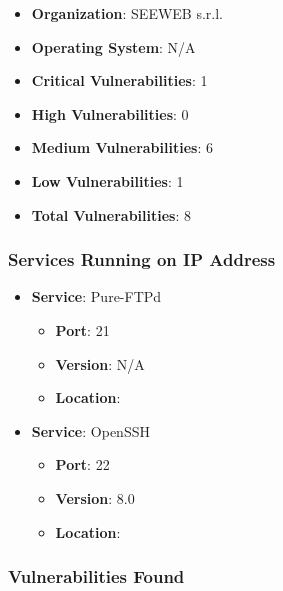 \documentclass{article}
\begin{document}
\begin{itemize}
    \item \textbf{Organization}: SEEWEB s.r.l.
    \item \textbf{Operating System}:  N/A 
    \item \textbf{Critical Vulnerabilities}: 1
    \item \textbf{High Vulnerabilities}: 0
    \item \textbf{Medium Vulnerabilities}: 6
    \item \textbf{Low Vulnerabilities}: 1
    \item \textbf{Total Vulnerabilities}: 8
\end{itemize}

\subsubsection*{Services Running on IP Address}

\begin{itemize}
    
        \item \textbf{Service}: Pure-FTPd
        \begin{itemize}
            \item \textbf{Port}: 21
            \item \textbf{Version}:  N/A 
            \item \textbf{Location}: \href{  }{  }
        \end{itemize}
    
        \item \textbf{Service}: OpenSSH
        \begin{itemize}
            \item \textbf{Port}: 22
            \item \textbf{Version}:  8.0 
            \item \textbf{Location}: \href{  }{  }
        \end{itemize}
    
\end{itemize}


\subsubsection*{Vulnerabilities Found}
\end{document}
